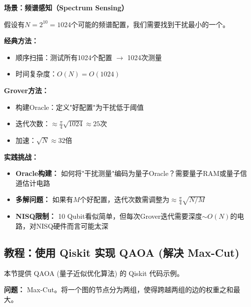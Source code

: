 \documentclass[11pt,a4paper]{article}
\begin{document}
\textbf{场景：频谱感知（Spectrum Sensing）}

假设有$N=2^{10}=1024$个可能的频谱配置，我们需要找到干扰最小的一个。

\textbf{经典方法：}
\begin{itemize}
\item 顺序扫描：测试所有1024个配置 $\rightarrow$ 1024次测量
\item 时间复杂度：$O(N) = O(1024)$
\end{itemize}

\textbf{Grover方法：}
\begin{itemize}
\item 构建Oracle：定义"好配置"为干扰低于阈值
\item 迭代次数：$\approx \frac{\pi}{4}\sqrt{1024} \approx 25$次
\item 加速：$\sqrt{N} \approx 32$倍
\end{itemize}

\textbf{实践挑战：}
\begin{itemize}
\item \textbf{Oracle构建：} 如何将"干扰测量"编码为量子Oracle？需要量子RAM或量子信道估计电路
\item \textbf{多解问题：} 如果有$M$个好配置，迭代次数需调整为$\approx \frac{\pi}{4}\sqrt{N/M}$
\item \textbf{NISQ限制：} 10 Qubit看似简单，但每次Grover迭代需要深度$\sim O(N)$的电路，对NISQ硬件而言可能太深
\end{itemize}

\subsection{教程：使用 Qiskit 实现 QAOA (解决 Max-Cut)}

本节提供 QAOA (量子近似优化算法) 的 Qiskit 代码示例。

\textbf{问题：} Max-Cut。将一个图的节点分为两组，使得跨越两组的边的权重之和最大。
\end{document}
